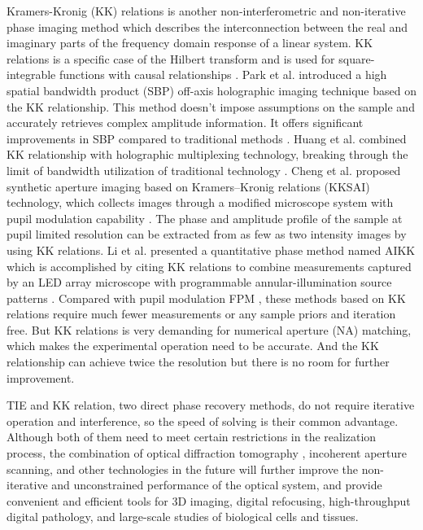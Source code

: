 \documentclass[journal,review,submit,pdftex,moreauthors]{Definitions/mdpi}
\begin{document}
Kramers-Kronig (KK) relations is another non-interferometric and non-iterative phase imaging method which describes the interconnection between the real and imaginary parts of the frequency domain response of a linear system. KK relations is a specific case of the Hilbert transform and is used for square-integrable functions with causal relationships \cite{chang2023robust}. Park et al. introduced a high spatial bandwidth product (SBP) off-axis holographic imaging technique based on the KK relationship. This method doesn't impose assumptions on the sample and accurately retrieves complex amplitude information. It offers significant improvements in SBP compared to traditional methods \cite{baek2021intensity}. Huang et al. combined KK relationship with holographic multiplexing technology, breaking through the limit of bandwidth utilization of traditional technology \cite{huang2022high}. Cheng et al. proposed synthetic aperture imaging based on Kramers–Kronig relations (KKSAI) technology, which collects images through a modified microscope system with pupil modulation capability \cite{shen2021non}. The phase and amplitude profile of the sample at pupil limited resolution can be extracted from as few as two intensity images by using KK relations. Li et al. presented a quantitative phase method named AIKK which is accomplished by citing KK relations to combine measurements captured by an LED array microscope with programmable annular-illumination source patterns \cite{li2021fast}. Compared with pupil modulation FPM \cite{ou2016aperture,lu2016quantitative}, these methods based on KK relations require much fewer measurements or any sample priors and iteration free. But KK relations is very demanding for numerical aperture (NA) matching, which makes the experimental operation need to be accurate. And the KK relationship can achieve twice the resolution but there is no room for further improvement.

TIE and KK relation, two direct phase recovery methods, do not require iterative operation and interference, so the speed of solving is their common advantage. Although both of them need to meet certain restrictions in the realization process, the combination of optical diffraction tomography \cite{ li2022transport,}, incoherent aperture scanning, and other technologies in the future will further improve the non-iterative and unconstrained performance of the optical system, and provide convenient and efficient tools for 3D imaging, digital refocusing, high-throughput digital pathology, and large-scale studies of biological cells and tissues.
\end{document}
